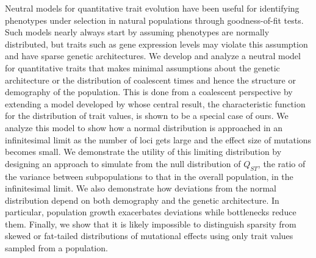 Neutral models for quantitative trait evolution have been useful for identifying
phenotypes under selection in natural populations through goodness-of-fit tests.
Such models nearly always start by assuming phenotypes are normally distributed,
but traits such as gene expression levels may violate this assumption and have
sparse genetic architectures. We develop and analyze a neutral model for
quantitative traits that makes minimal assumptions about the genetic
architecture or the distribution of coalescent times and hence the structure or
demography of the population. This is done from a coalescent perspective by
extending a model developed by \citet{Schraiber2015} whose central result, the
characteristic function for the distribution of trait values, is shown to be a
special case of ours. We analyze this model to show how a normal distribution is
approached in an infinitesimal limit as the number of loci gets large and the
effect size of mutations becomes small. We demonstrate the utility of this
limiting distribution by designing an approach to simulate from the null
distribution of $Q_{ST}$, the ratio of the variance between subpopulations to
that in the overall population, in the infinitesimal limit. We also demonstrate
how deviations from the normal distribution depend on both demography and the
genetic architecture. In particular, population growth exacerbates deviations
while bottlenecks reduce them. Finally, we show that it is likely impossible to
distinguish sparsity from skewed or fat-tailed distributions of mutational
effects using only trait values sampled from a population.

